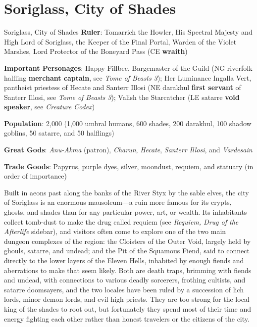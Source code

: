 \documentclass[10pt,a4paper,twoside,bg=print,twocolumn,openany,nodeprecatedcode]{dndbook}
\begin{document}
\section{Soriglass, City of Shades}
\begin{DndSidebar}[float=!b]{Soriglass, City of Shades}
\textbf{Ruler}: Tomarrich the Howler, His Spectral Majesty and High Lord of Soriglass, the Keeper of the Final Portal, Warden of the Violet Marshes, Lord Protector of the Boneyard Pass (CE \textbf{wraith})



\textbf{Important Personages}: Happy Fillbec, Bargemaster of the Guild (NG riverfolk halfling \textbf{merchant captain}, see \textit{Tome of Beasts 3}); Her Luminance Ingalla Vert, pantheist priestess of Hecate and Santerr Illosi (NE darakhul \textbf{first servant} of Santerr Illosi, see \textit{Tome of Beasts 3}); Valish the Starcatcher (LE satarre \textbf{void speaker}, see \textit{Creature Codex})



\textbf{Population}: 2,000 (1,000 umbral humans, 600 shades, 200 darakhul, 100 shadow goblins, 50 satarre, and 50 halflings)



\textbf{Great Gods}: \textit{Anu-Akma} (patron), \textit{Charun}, \textit{Hecate}, \textit{Santerr Illosi}, and \textit{Vardesain}



\textbf{Trade Goods}: Papyrus, purple dyes, silver, moondust, requiem, and statuary (in order of importance)





\end{DndSidebar}

Built in aeons past along the banks of the River Styx by the sable elves, the city of Soriglass is an enormous mausoleum—a ruin more famous for its crypts, ghosts, and shades than for any particular power, art, or wealth. Its inhabitants collect tomb-dust to make the drug called requiem (see \textit{Requiem, Drug of the Afterlife} sidebar), and visitors often come to explore one of the two main dungeon complexes of the region: the Cloisters of the Outer Void, largely held by ghouls, satarre, and undead; and the Pit of the Squamous Fiend, said to connect directly to the lower layers of the Eleven Hells, inhabited by enough fiends and aberrations to make that seem likely. Both are death traps, brimming with fiends and undead, with connections to various deadly sorcerers, frothing cultists, and satarre doomsayers, and the two locales have been ruled by a succession of lich lords, minor demon lords, and evil high priests. They are too strong for the local king of the shades to root out, but fortunately they spend most of their time and energy fighting each other rather than honest travelers or the citizens of the city.
\end{document}
